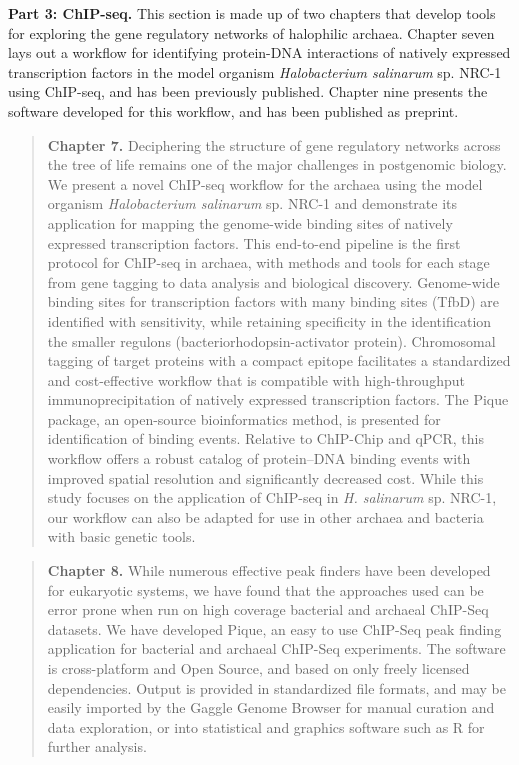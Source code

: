 \noindent\textbf{Part 3: ChIP-seq.}
This section is made up of two chapters that develop tools for exploring the gene regulatory networks of halophilic archaea. Chapter seven lays out a workflow for identifying protein-DNA interactions of natively expressed transcription factors in the model organism {\em Halobacterium salinarum} sp. NRC-1 using ChIP-seq, and has been previously published. \cite{wilbanks2012workflow} Chapter nine presents the software developed for this workflow, and has been published as preprint. \cite{neches2014fit}

\begin{quote}
\noindent\textbf{Chapter 7.} Deciphering the structure of gene regulatory
networks across the tree of life remains one of the major challenges in
postgenomic biology. We present a novel ChIP-seq workflow for the archaea
using the model organism {\em Halobacterium salinarum} sp. NRC-1 and
demonstrate its application for mapping the genome-wide binding sites of
natively expressed transcription factors. This end-to-end pipeline is the
first protocol for ChIP-seq in archaea, with methods and tools for each stage
from gene tagging to data analysis and biological discovery. Genome-wide
binding sites for transcription factors with many binding sites (TfbD) are
identified with sensitivity, while retaining specificity in the identification
the smaller regulons (bacteriorhodopsin-activator protein). Chromosomal
tagging of target proteins with a compact epitope facilitates a standardized
and cost-effective workflow that is compatible with high-throughput
immunoprecipitation of natively expressed transcription factors. The Pique
package, an open-source bioinformatics method, is presented for identification
of binding events. Relative to ChIP-Chip and qPCR, this workflow offers a
robust catalog of protein–DNA binding events with improved spatial resolution
and significantly decreased cost. While this study focuses on the application
of ChIP-seq in {\em H. salinarum} sp. NRC-1, our workflow can also be adapted
for use in other archaea and bacteria with basic genetic tools.
\end{quote}

\begin{quote}
\noindent\textbf{Chapter 8.} While numerous effective peak
finders have been developed for eukaryotic systems, we have found that the
approaches used can be error prone when run on high coverage bacterial and
archaeal ChIP-Seq datasets. We have developed Pique, an easy to use ChIP-Seq
peak finding application for bacterial and archaeal ChIP-Seq experiments. The
software is cross-platform and Open Source, and based on only freely licensed
dependencies. Output is provided in standardized file formats, and may be
easily imported by the Gaggle Genome Browser for manual curation and data
exploration, or into statistical and graphics software such as R for further
analysis.
\end{quote}

